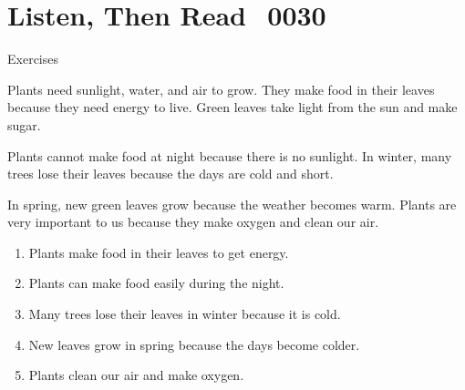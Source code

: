 \documentclass[aspectratio=169,xcolor={dvipsnames,table}]{beamer}
\begin{document}
\section{Listen, Then Read\,\,\,\,\,{\tiny 0030}\,{\scriptsize {}}}
\begin{frame}[plain,t]{Exercises}
\vspace*{-8pt}
\begin{tcolorbox}[colframe=ForestGreen,
  colback=NavyBlue!10!white,
  colbacktitle=NavyBlue!40!white,
  coltitle=black, %
before upper={\setlength{\parindent}{1.25em}},
  title={Why Plants Need Sunlight\hfill{\tiny 0030}\quad{\scriptsize \myaudio{./audio/023_because_reading.mp3}}}
]
Plants need sunlight, water, and air to grow. They make food in their leaves because they need energy to live. Green leaves take light from the sun and make sugar.

Plants cannot make food at night because there is no sunlight. In winter, many trees lose their leaves because the days are cold and short.

In spring, new green leaves grow because the weather becomes warm. Plants are very important to us because they make oxygen and clean our air.
\end{tcolorbox}

\vspace{-4pt}
\vspace{-11pt}
\begin{enumerate}\setlength{\itemsep}{-3.4pt}
\item<2-> Plants make food in their leaves to get energy.\hfill{}
\item<2-> Plants can make food easily during the night.\hfill{}
\item<2-> Many trees lose their leaves in winter because it is cold.\hfill{}
\item<2-> New leaves grow in spring because the days become colder.\hfill{}
\item<2-> Plants clean our air and make oxygen.\hfill{}
\end{enumerate}
\end{frame}
\end{document}
